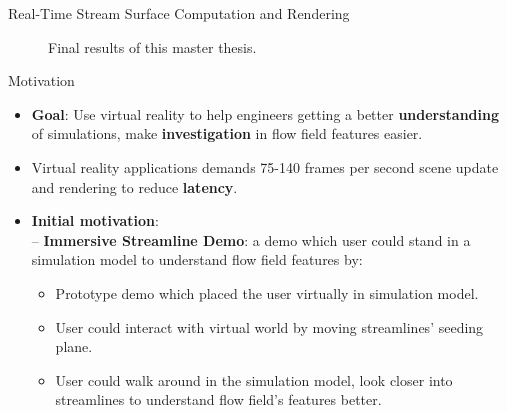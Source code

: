 \documentclass{beamer}
\begin{document}
\begin{frame}{Real-Time Stream Surface Computation and Rendering}
\begin{figure}
{		}
		\caption{
			Final results of this master thesis.
		}
	\end{figure}
\end{frame}

\begin{frame}{Motivation}
	\begin{itemize}
		\item \textbf{Goal}: Use virtual reality to help engineers getting a better \textbf{understanding} of simulations, make \textbf{investigation} in flow field features easier.
		\item Virtual reality applications demands 75-140 frames per second scene update and rendering to reduce \textbf{latency}.
		\item \textbf{Initial motivation}:\\
		  -- \textbf{Immersive Streamline Demo}: a demo which user could stand in a simulation model to understand flow field features by:
		  \begin{itemize}
		  	\item Prototype demo which placed the user virtually in simulation model.
		  	\item User could interact with virtual world by moving streamlines' seeding plane.
		  	\item User could walk around in the simulation model, look closer into streamlines to understand flow field's features better.
		  \end{itemize} 
	\end{itemize}
\end{frame}
\end{document}
